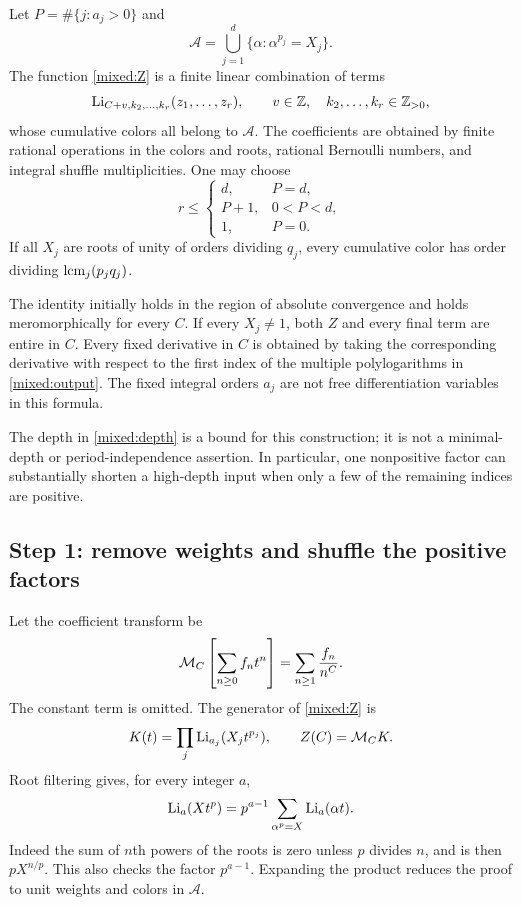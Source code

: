 \begin{theorem}\label{mixed:main}
Let $P=\#\{j:a_j>0\}$ and
\[
                \mathcal A=\bigcup_{j=1}^d\{\alpha:\alpha^{p_j}=X_j\}.
\]
The function \eqref{mixed:Z} is a finite linear combination of terms
\begin{equation}\label{mixed:output}
          \operatorname{Li}_{C+v,k_2,\ldots,k_r}(z_1,\ldots,z_r),
 \qquad v\in\mathbb Z,\quad k_2,\ldots,k_r\in\mathbb Z_{>0},
\end{equation}
whose cumulative colors all belong to $\mathcal A$. The coefficients
are obtained by finite rational operations in the colors and roots,
rational Bernoulli numbers, and integral shuffle multiplicities.
One may choose
\begin{equation}\label{mixed:depth}
 r\le\begin{cases}
 d,&P=d,\\
 P+1,&0<P<d,\\
 1,&P=0.
 \end{cases}
\end{equation}
If all $X_j$ are roots of unity of orders dividing $q_j$, every
cumulative color has order dividing $\operatorname{lcm}_j(p_jq_j)$.

The identity initially holds in the region of absolute convergence
and holds meromorphically for every $C$. If every $X_j\ne1$, both
$Z$ and every final term are entire in $C$. Every fixed derivative
in $C$ is obtained by taking the corresponding derivative with respect
to the first index
of the multiple polylogarithms in \eqref{mixed:output}.
The fixed integral orders $a_j$ are not free differentiation variables
in this formula.
\end{theorem}

The depth in \eqref{mixed:depth} is a bound for this construction;
it is not a minimal-depth or period-independence assertion. In particular,
one nonpositive factor can substantially shorten a high-depth input
when only a few of the remaining indices are positive.

\subsection{Step 1: remove weights and shuffle the positive factors}

Let the coefficient transform be
\[
 \mathcal M_C\left[\sum_{n\ge0}f_nt^n\right]
             =\sum_{n\ge1}\frac{f_n}{n^C}.
\]
The constant term is omitted. The generator of \eqref{mixed:Z} is
\begin{equation}\label{mixed:generator}
 K(t)=\prod_j\operatorname{Li}_{a_j}(X_jt^{p_j}),\qquad Z(C)=\mathcal M_C K.
\end{equation}
Root filtering gives, for every integer $a$,
\begin{equation}\label{mixed:roots}
            \operatorname{Li}_a(Xt^p)=p^{a-1}\sum_{\alpha^p=X}\operatorname{Li}_a(\alpha t).
\end{equation}
Indeed the sum of $n$th powers of the roots is zero unless $p$ divides
$n$, and is then $pX^{n/p}$. This also checks the factor $p^{a-1}$.
Expanding the product reduces the proof to unit weights and colors
in $\mathcal A$.

